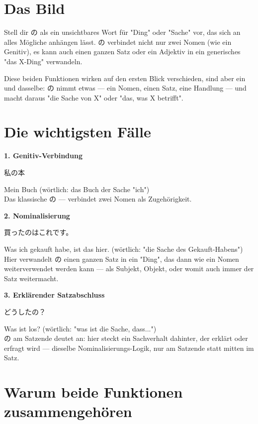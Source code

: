 \documentclass[12pt]{book}
\begin{document}
\section*{Das Bild}

Stell dir の als ein unsichtbares Wort für "Ding" oder "Sache" vor, das sich an alles Mögliche anhängen lässt. の verbindet nicht nur zwei Nomen (wie ein Genitiv), es kann auch einen ganzen Satz oder ein Adjektiv in ein generisches "das X-Ding" verwandeln.

Diese beiden Funktionen wirken auf den ersten Blick verschieden, sind aber ein und dasselbe: の nimmt etwas — ein Nomen, einen Satz, eine Handlung — und macht daraus "die Sache von X" oder "das, was X betrifft".

\section*{Die wichtigsten Fälle}

\textbf{1. Genitiv-Verbindung}
\par\quad 私の本\\
\par\quad Mein Buch (wörtlich: das Buch der Sache "ich")\\

Das klassische の — verbindet zwei Nomen als Zugehörigkeit.

\textbf{2. Nominalisierung}
\par\quad 買ったのはこれです。\\
\par\quad Was ich gekauft habe, ist das hier. (wörtlich: "die Sache des Gekauft-Habens")\\

Hier verwandelt の einen ganzen Satz in ein "Ding", das dann wie ein Nomen weiterverwendet werden kann — als Subjekt, Objekt, oder womit auch immer der Satz weitermacht.

\textbf{3. Erklärender Satzabschluss}
\par\quad どうしたの？\\
\par\quad Was ist los? (wörtlich: "was ist die Sache, dass...")\\

の am Satzende deutet an: hier steckt ein Sachverhalt dahinter, der erklärt oder erfragt wird — dieselbe Nominalisierungs-Logik, nur am Satzende statt mitten im Satz.

\section*{Warum beide Funktionen zusammengehören}
\end{document}
